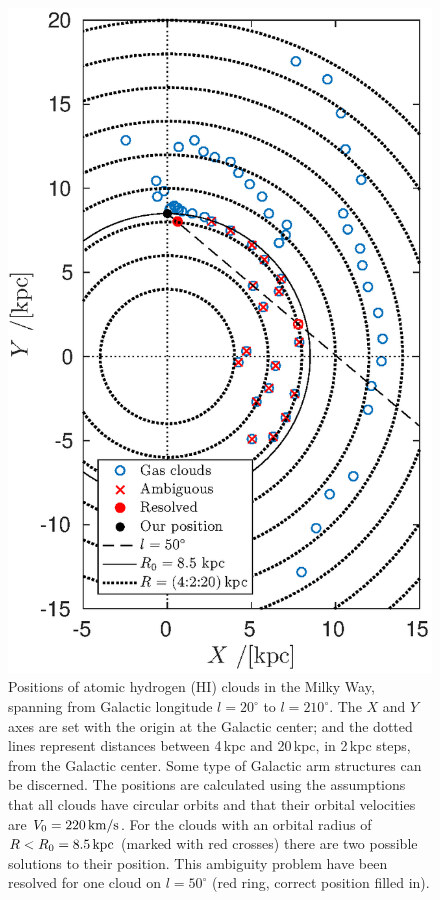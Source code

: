 \documentclass[11pt,a4paper, twocolumn,
swedish, english %
]{article}
\begin{document}
\begin{figure}\centering
\includegraphics[width=1\linewidth]{gas_clouds.eps}
\caption{Positions of atomic hydrogen (HI) clouds in the Milky Way,
  spanning from Galactic longitude $l=20^\circ$ to $l=210^\circ$. The
  $X$ and $Y$ axes are set with the origin at the Galactic center; and
  the dotted lines represent distances between 4\,kpc and 20\,kpc, in
  2\,kpc steps, from the Galactic center. Some type of Galactic arm
  structures can be discerned. The positions are calculated using the
  assumptions that all clouds have circular orbits and that their
  orbital velocities are $V_0=\unit[220]{km/s}$. For the clouds with
  an orbital radius of $R<R_0=\unit[8.5]{kpc}$ (marked with red
  crosses) there are two possible solutions to their position. This
  ambiguity problem have been resolved for one cloud on $l=50^\circ$ 
  (red ring, correct position filled in). }
\label{fig:clouds}
\end{figure}
\end{document}
